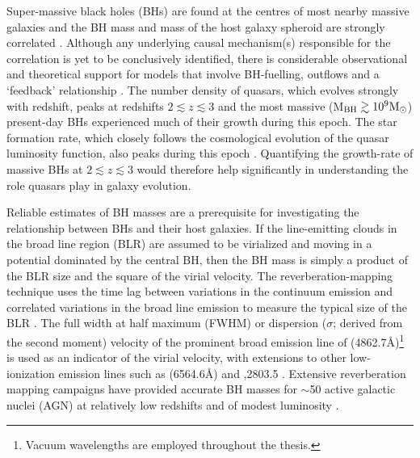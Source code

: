 Super-massive black holes (BHs) are found at the centres of most nearby massive galaxies and the BH mass and mass of the host galaxy spheroid are strongly correlated \citep{ferrarese00,gebhardt00,kormendy13}. 
Although any underlying causal mechanism(s) responsible for the correlation is yet to be conclusively identified, there is considerable observational and theoretical support for models that involve BH-fuelling, outflows and a `feedback' relationship \citep[e.g.][]{king15}.  
The number density of quasars, which evolves strongly with redshift, peaks at redshifts $2 \lesssim z \lesssim 3$ \citep[e.g.][]{brandt05,richards06b} and the most massive (M$_{\rm BH} \gtrsim 10^9{{{\rm M_\odot}}}$) present-day BHs experienced much of their growth during this epoch.  
The star formation rate, which closely follows the cosmological evolution of the quasar luminosity function, also peaks during this epoch \citep[e.g.][]{boyle98}. 
Quantifying the growth-rate of massive BHs at $2 \lesssim z \lesssim 3$ would therefore help significantly in understanding the role quasars play in galaxy evolution.

Reliable estimates of BH masses are a prerequisite for investigating the relationship between BHs and their host galaxies.  
If the line-emitting clouds in the broad line region (BLR) are assumed to be virialized and moving in a potential dominated by the central BH, then the BH mass is simply a product of the BLR size and the square of the virial velocity.
The reverberation-mapping technique uses the time lag between variations in the continuum emission and correlated variations in the broad line emission to measure the typical size of the BLR \citep{peterson93,peterson14}. 
The full width at half maximum (FWHM) or dispersion ($\sigma$; derived from the second moment) velocity of the prominent broad emission line of \hb (4862.7\AA)\footnote{Vacuum wavelengths are employed throughout the thesis.} is used as an indicator of the virial velocity, with extensions to other low-ionization emission lines such as \ha (6564.6\AA) and ,2803.5 \citep[e.g.][]{vestergaard02,mclure02,wu04,kollmeier06,onken08,wang09,rafiee11}.
Extensive reverberation mapping campaigns have provided accurate BH masses for $\sim$50 active galactic nuclei (AGN) at relatively low redshifts and of modest luminosity \citep[e.g.][]{kaspi00,kaspi07,peterson04,bentz09,denney10}. 

